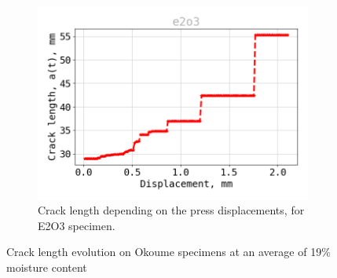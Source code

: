 \begin{figure}[H]
\begin{subfigure}{0.48\linewidth}
	\centering
	\includegraphics[width=\textwidth]{Figures/e2o3_a}
	\decoRule
	\caption[Crack length E2O3]{Crack length depending on the press displacements, for E2O3 specimen.}
	\label{fig:E2O3_a}
\end{subfigure}
\caption{Crack length evolution on Okoume specimens at an average of 19\% moisture content}
\label{E2o_a}
\end{figure}

